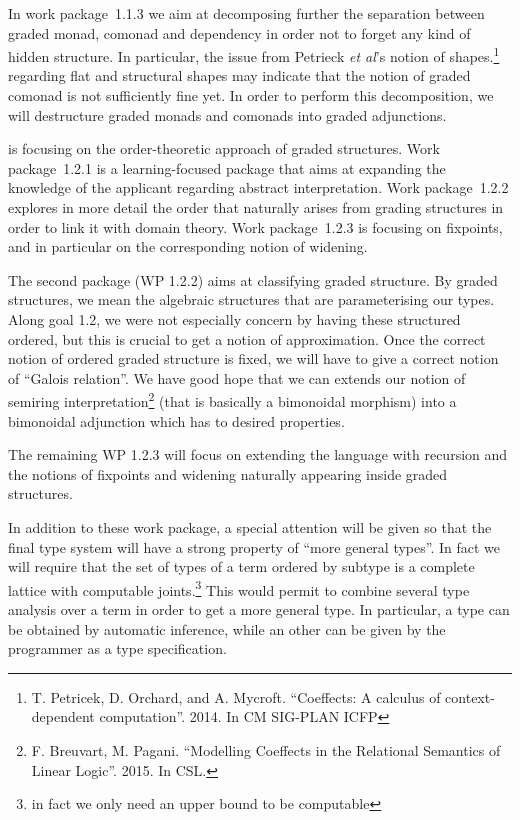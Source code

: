 \documentclass{article}[11pt]
\begin{document}
In work package~1.1.3 we aim at decomposing further the separation between graded monad, comonad and dependency in order not to forget any kind of hidden structure. In particular, the issue from Petrieck {\em et al}'s notion of shapes.\footnote{T. Petricek, D. Orchard, and A. Mycroft. ``Coeffects: A calculus of context-dependent computation''. 2014. In CM SIG-PLAN ICFP} regarding flat and structural shapes may indicate that the notion of graded comonad is not sufficiently fine yet. In order to perform this decomposition, we will destructure graded monads and comonads into graded adjunctions.

 is focusing on the order-theoretic approach of graded structures. Work package~1.2.1 is a learning-focused package that aims at expanding the knowledge of the applicant regarding abstract interpretation. %
Work package~1.2.2 explores in more detail the order that naturally arises from grading structures in order to link it with domain theory. Work package~1.2.3 is focusing on fixpoints, and in particular on the corresponding notion of widening.


The second package (WP 1.2.2) aims at classifying graded structure. By graded structures, we mean the algebraic structures that are parameterising our types. Along goal 1.2, we were not especially concern by having these structured ordered, but this is crucial to get a notion of approximation. Once the correct notion of ordered graded structure is fixed, we will have to give a correct notion of ``Galois relation''. We have good hope that we can extends our notion of semiring interpretation\footnote{F. Breuvart, M. Pagani. ``Modelling Coeffects in the Relational Semantics of Linear Logic''. 2015. In CSL.} (that is basically a bimonoidal morphism) into a bimonoidal adjunction which has to desired properties.

The remaining WP 1.2.3 will focus on extending the language with recursion and the notions of fixpoints and widening naturally appearing inside graded structures.

In addition to these work package, a special attention will be given so that the final type system will have a strong property of ``more general types''. In fact we will require that the set of types of a term ordered by subtype is a complete lattice with computable joints.\footnote{in fact we only need an upper bound to be computable} This would permit to combine several type analysis over a term in order to get a more general type. In particular, a type can be obtained by automatic inference, while an other can be given by the programmer as a type specification.
\end{document}
